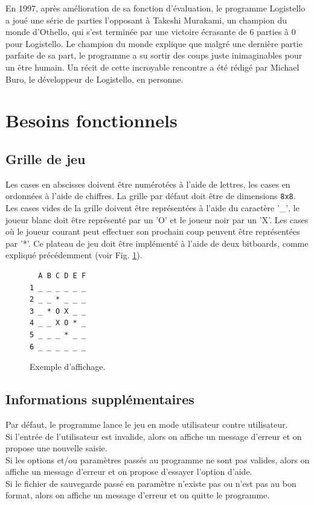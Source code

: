 \documentclass[10pt,a4paper]{article}
\begin{document}
En 1997, après amélioration de sa fonction d'évaluation, le programme Logistello a joué une série de parties l'opposant à Takeshi Murakami, un champion du monde d'Othello, qui s'est terminée par une victoire écrasante de 6 parties à 0 pour Logistello. Le champion du monde explique que malgré une dernière partie parfaite de sa part, le programme a su sortir des coups juste inimaginables pour un être humain. Un récit de cette incroyable rencontre a été rédigé par Michael Buro, le développeur de Logistello, en personne\cite{Bur97b}.


\newpage
\section{Besoins fonctionnels}
\label{sec:besoins_fonctionnels}

\subsection{Grille de jeu}
\label{board}

Les cases en abscisses doivent être numérotées à l'aide de lettres, les cases en ordonnées à l'aide de chiffres. La grille par défaut doit être de dimensions \verb!8x8!. Les cases vides de la grille doivent être représentées à l'aide du caractère '\_', le joueur blanc doit être représenté par un 'O' et le joueur noir par un 'X'. Les cases où le joueur courant peut effectuer son prochain coup peuvent être représentées par '*'. Ce plateau de jeu doit être implémenté à l'aide de deux bitboards, comme expliqué précédemment (voir Fig. \ref{fig:exemple_board}).

\begin{figure}[H]    
\centering
\begin{BVerbatim}
  A B C D E F
1 _ _ _ _ _ _
2 _ _ * _ _ _
3 _ * O X _ _
4 _ _ X O * _
5 _ _ _ * _ _
6 _ _ _ _ _ _  
\end{BVerbatim}
\caption{Exemple d'affichage.\label{fig:exemple_board}}
\end{figure}

\subsection{Informations supplémentaires}
Par défaut, le programme lance le jeu en mode utilisateur contre utilisateur.\\
Si l'entrée de l'utilisateur est invalide, alors on affiche un message d'erreur et on propose une nouvelle saisie.\\
Si les options et/ou paramètres passés au programme ne sont pas valides, alors on affiche un message d'erreur et on propose d'essayer l'option d'aide.\\
Si le fichier de sauvegarde passé en paramètre n'existe pas ou n'est pas au bon format, alors on affiche un message d'erreur et on quitte le programme.
\end{document}
